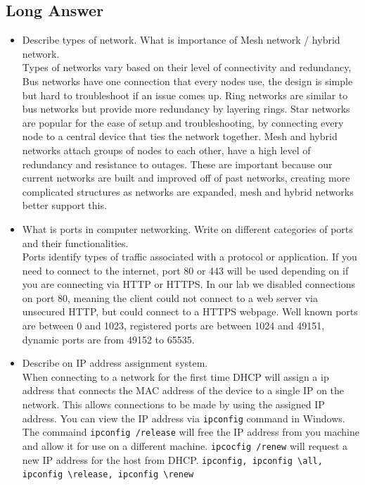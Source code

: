 \subsection{Long Answer}
\begin{itemize}
    \item Describe types of network. What is importance of Mesh network / hybrid network.\\
    Types of networks vary based on their level of connectivity and redundancy, Bus networks have one connection that every nodes use, the design is simple but hard to troubleshoot if an issue comes up.
    Ring networks are similar to bus networks but provide more redundancy by layering rings.
    Star networks are popular for the ease of setup and troubleshooting, by connecting every node to a central device that ties the network together.
    Mesh and hybrid networks attach groups of nodes to each other, have a high level of redundancy and resistance to outages.
    These are important because our current networks are built and improved off of past networks, creating more complicated structures as networks are expanded, mesh and hybrid networks better support this.
    \item What is ports in computer networking. Write on different categories of ports and their functionalities.\\
    Ports identify types of traffic associated with a protocol or application.
    If you need to connect to the internet, port 80 or 443 will be used depending on if you are connecting via HTTP or HTTPS.
    In our lab we disabled connections on port 80, meaning the client could not connect to a web server via unsecured HTTP, but could connect to a HTTPS webpage.
    Well known ports are between 0 and 1023, registered ports are between 1024 and 49151, dynamic ports are from 49152 to 65535.
    \item Describe on IP address assignment system.\\
    When connecting to a network for the first time DHCP will assign a ip address that connects the MAC address of the device to a single IP on the network.
    This allows connections to be made by using the assigned IP address.
    You can view the IP address via \verb|ipconfig| command in Windows.
    The commaind \verb|ipconfig /release| will free the IP address from you machine and allow it for use on a different machine.
    \verb|ipcocfig /renew| will request a new IP address for the host from DHCP.
    \verb|ipconfig, ipconfig \all, ipconfig \release, ipconfig \renew|

\end{itemize}

